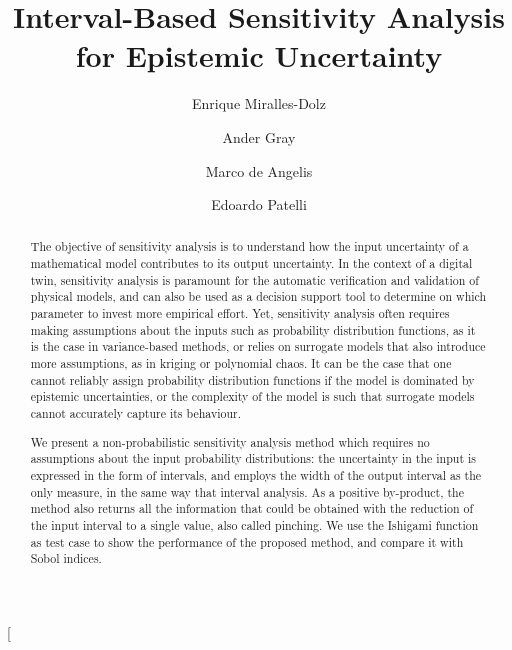 \documentclass[twocolumn]{rps-esrl2020}
\begin{document}

\twocolumn[

\title{Interval-Based Sensitivity Analysis for Epistemic Uncertainty}

\author{Enrique Miralles-Dolz}

\address{Institute for Risk and Uncertainty, University of Liverpool, United Kingdom. }
\address{Culham Centre for Fusion Energy, United Kingdom Atomic Energy Authority, United Kingdom}

\author{Ander Gray}

\address{Institute for Risk and Uncertainty, University of Liverpool, United Kingdom. }
\address{Culham Centre for Fusion Energy, United Kingdom Atomic Energy Authority, United Kingdom}

\author{Marco de Angelis}

\address{Institute for Risk and Uncertainty, University of Liverpool, United Kingdom. }

\author{Edoardo Patelli}

\address{Centre for Intelligent Infrastructure, University of Strathclyde, United Kingdom. }

\begin{abstract}
	The objective of sensitivity analysis is to understand how the input uncertainty of a mathematical model contributes to its output uncertainty.
	In the context of a digital twin, sensitivity analysis is paramount for the automatic verification and validation of physical models, and can also
	be used as a decision support tool to determine on which parameter to invest more empirical effort. Yet, sensitivity analysis often requires making
	assumptions about the inputs such as probability distribution functions, as it is the case in variance-based methods, or relies on surrogate models
	that also introduce more assumptions, as in kriging or polynomial chaos. It can be the case that one cannot reliably assign probability distribution
	functions if the model is dominated by epistemic uncertainties, or the complexity of the model is such that surrogate models cannot accurately capture
	its behaviour.

	We present a non-probabilistic sensitivity analysis method which requires no assumptions about the input probability distributions: the uncertainty in
	the input is expressed in the form of intervals, and employs the width of the output interval as the only measure, in the same way that interval analysis.
	As a positive by-product, the method also returns all the information that could be obtained with the reduction of the input interval to a single value,
	also called pinching. We use the Ishigami function as test case to show the performance of the proposed method, and compare it with Sobol indices.
\end{abstract}
\end{document}
